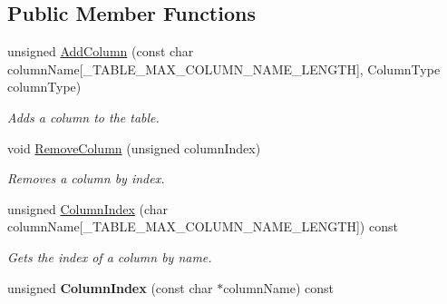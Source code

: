 \subsection*{Public Member Functions}
\begin{DoxyCompactItemize}
\item 
unsigned \hyperlink{class_data_structures_1_1_table_a12424b1f823e7ad2c6b1bd0ad99342da}{Add\-Column} (const char column\-Name\mbox{[}\-\_\-\-T\-A\-B\-L\-E\-\_\-\-M\-A\-X\-\_\-\-C\-O\-L\-U\-M\-N\-\_\-\-N\-A\-M\-E\-\_\-\-L\-E\-N\-G\-T\-H\mbox{]}, Column\-Type column\-Type)
\begin{DoxyCompactList}\small\item\em Adds a column to the table. \end{DoxyCompactList}\item 
void \hyperlink{class_data_structures_1_1_table_a3b3b27505c500a4f1927ff32e5332fbb}{Remove\-Column} (unsigned column\-Index)
\begin{DoxyCompactList}\small\item\em Removes a column by index. \end{DoxyCompactList}\item 
unsigned \hyperlink{class_data_structures_1_1_table_afa78235f4dea81b5150cffc50de32c81}{Column\-Index} (char column\-Name\mbox{[}\-\_\-\-T\-A\-B\-L\-E\-\_\-\-M\-A\-X\-\_\-\-C\-O\-L\-U\-M\-N\-\_\-\-N\-A\-M\-E\-\_\-\-L\-E\-N\-G\-T\-H\mbox{]}) const 
\begin{DoxyCompactList}\small\item\em Gets the index of a column by name. \end{DoxyCompactList}\item 
\hypertarget{class_data_structures_1_1_table_aecf875516ff41ded5fd0fb77fb09fc57}{unsigned {\bfseries Column\-Index} (const char $\ast$column\-Name) const }\label{class_data_structures_1_1_table_aecf875516ff41ded5fd0fb77fb09fc57}


\end{DoxyCompactItemize}
